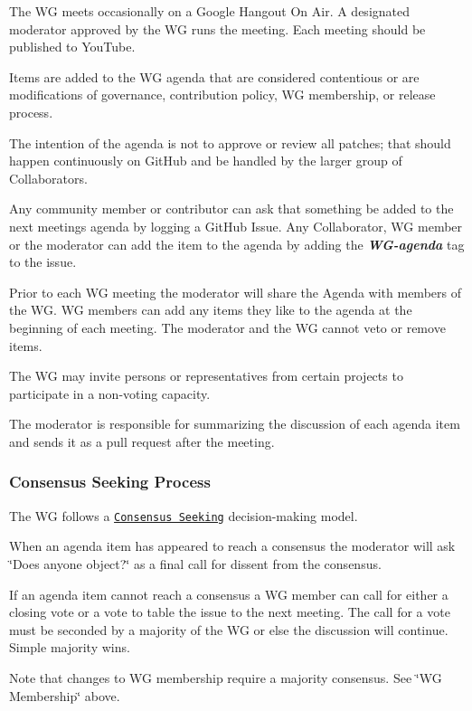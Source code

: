 The WG meets occasionally on a Google Hangout On Air. A designated moderator approved by the WG runs the meeting. Each meeting should be published to You\+Tube.

Items are added to the WG agenda that are considered contentious or are modifications of governance, contribution policy, WG membership, or release process.

The intention of the agenda is not to approve or review all patches; that should happen continuously on Git\+Hub and be handled by the larger group of Collaborators.

Any community member or contributor can ask that something be added to the next meeting\textquotesingle{}s agenda by logging a Git\+Hub Issue. Any Collaborator, WG member or the moderator can add the item to the agenda by adding the {\itshape {\bfseries W\+G-\/agenda}} tag to the issue.

Prior to each WG meeting the moderator will share the Agenda with members of the WG. WG members can add any items they like to the agenda at the beginning of each meeting. The moderator and the WG cannot veto or remove items.

The WG may invite persons or representatives from certain projects to participate in a non-\/voting capacity.

The moderator is responsible for summarizing the discussion of each agenda item and sends it as a pull request after the meeting.

\subsubsection*{Consensus Seeking Process}

The WG follows a \href{http://en.wikipedia.org/wiki/Consensus-seeking_decision-making}{\tt Consensus Seeking} decision-\/making model.

When an agenda item has appeared to reach a consensus the moderator will ask \char`\"{}\+Does anyone object?\char`\"{} as a final call for dissent from the consensus.

If an agenda item cannot reach a consensus a WG member can call for either a closing vote or a vote to table the issue to the next meeting. The call for a vote must be seconded by a majority of the WG or else the discussion will continue. Simple majority wins.

Note that changes to WG membership require a majority consensus. See \char`\"{}\+W\+G Membership\char`\"{} above. 